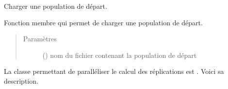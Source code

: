 \documentclass[letterpaper,10pt,french]{sphinxmanual}
\begin{document}
\begin{fulllineitems}
\begin{fulllineitems}
\end{fulllineitems}


\begin{fulllineitems}
\label{\detokenize{code:simgen.model.startpop}}
Charger une population de départ.

Fonction membre qui permet de charger une population de départ.
\begin{quote}\begin{description}
\item[{Paramètres}] \leavevmode
{} () \textendash{} nom du fichier contenant la population de départ

\end{description}\end{quote}

\end{fulllineitems}


\end{fulllineitems}


La classe permettant de paralléliser le calcul des réplications est . Voici sa description.
\end{document}
